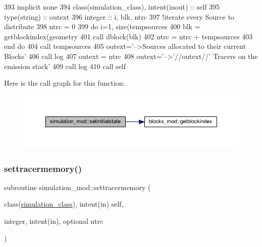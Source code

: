 \begin{DoxyCode}
393     \textcolor{keywordtype}{implicit none}
394     \textcolor{keywordtype}{class}(simulation\_class), \textcolor{keywordtype}{intent(inout)} :: self
395     \textcolor{keywordtype}{type}(string) :: outext
396     \textcolor{keywordtype}{integer} :: i, blk, ntrc
397     \textcolor{comment}{!iterate every Source to distribute}
398     ntrc = 0
399     \textcolor{keywordflow}{do} i=1, \textcolor{keyword}{size}(tempsources%
400         blk = getblockindex(geometry%
401         \textcolor{keyword}{call }dblock(blk)%
402         ntrc = ntrc + tempsources%
403 \textcolor{keywordflow}{    end do}
404     \textcolor{keyword}{call }tempsources%
405     outext=\textcolor{stringliteral}{'-->Sources allocated to their current Blocks'}
406     \textcolor{keyword}{call }log%
407     outext = ntrc
408     outext=\textcolor{stringliteral}{'-->'}//outext//\textcolor{stringliteral}{' Tracers on the emission stack'}
409     \textcolor{keyword}{call }log%
410     \textcolor{keyword}{call }self%
\end{DoxyCode}
Here is the call graph for this function\+:\nopagebreak
\begin{figure}[H]
\begin{center}
\leavevmode
\includegraphics[width=350pt]{namespacesimulation__mod_a447c6d709de6aa360a65d39d660e627b_cgraph}
\end{center}
\end{figure}
\mbox{\label{namespacesimulation__mod_acc5fa823c8dd599de8feda8988c224f2}} 
\subsubsection{\texorpdfstring{settracermemory()}{settracermemory()}}
{\footnotesize\ttfamily subroutine simulation\+\_\+mod\+::settracermemory (\begin{DoxyParamCaption}\item[{class(\mbox{\hyperlink{structsimulation__mod_1_1simulation__class}{simulation\+\_\+class}}), intent(in)}]{self,  }\item[{integer, intent(in), optional}]{ntrc }\end{DoxyParamCaption})\hspace{0.3cm}{\ttfamily [private]}}



